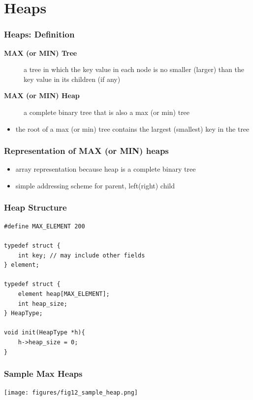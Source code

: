 \documentclass[newPxFont,sthlmFooter,nooffset]{beamer}
\begin{document}
\section{Heaps}
\begin{frame}[t]
  \frametitle{Heaps: Definition}
  \begin{description}
  \item[\textbf{MAX (or MIN) Tree}] a tree in which the key value in each node is no smaller (larger) than the key value in its children (if any)
  \item [\textbf{MAX (or MIN) Heap}] a complete binary tree that is also a max (or min) tree
  \end{description}
  \begin{itemize}
  \item the root of a max (or min) tree contains the largest (smallest) key in the tree
  \end{itemize}
\end{frame}


\begin{frame}[t]
  \frametitle{Representation of MAX (or MIN) heaps}
  \begin{itemize}
  \item array representation because heap is a complete binary tree

  \item simple addressing scheme for parent, left(right) child
  \end{itemize}

\end{frame}


\begin{frame}[t, fragile]
  \frametitle{Heap Structure}
\label{lst:heapstruct}
  \begin{lstlisting}
#define MAX_ELEMENT 200

typedef struct {
	int key; // may include other fields
} element;

typedef struct {
	element heap[MAX_ELEMENT];
	int heap_size;
} HeapType;

void init(HeapType *h){
	h->heap_size = 0;
}
  \end{lstlisting}
\end{frame}


\begin{frame}[t]
  \frametitle{Sample Max Heaps}
  \begin{center}
    \texttt{[image: figures/fig12\_sample\_heap.png]}
  \end{center}

\end{frame}
\end{document}

